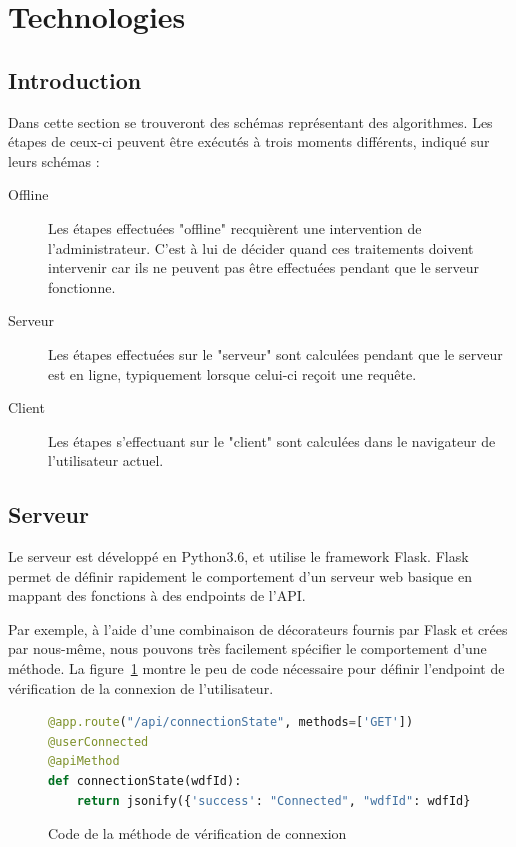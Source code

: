 
\section{Technologies}

	\subsection{Introduction}

		Dans cette section se trouveront des schémas représentant des algorithmes. Les étapes de ceux-ci peuvent être exécutés à trois moments différents, indiqué sur leurs schémas :
		\begin{description}
			\item[Offline] Les étapes effectuées "offline" recquièrent une intervention de l'administrateur. C'est à lui de décider quand ces traitements doivent intervenir car ils ne peuvent pas être effectuées pendant que le serveur fonctionne.
			\item[Serveur] Les étapes effectuées sur le "serveur" sont calculées pendant que le serveur est en ligne, typiquement lorsque celui-ci reçoit une requête.
			\item[Client] Les étapes s'effectuant sur le "client" sont calculées dans le navigateur de l'utilisateur actuel.
		\end{description}

	\subsection{Serveur}

		Le serveur est développé en Python3.6, et utilise le framework Flask. Flask permet de définir rapidement le comportement d'un serveur web basique en mappant des fonctions à des endpoints de l'API.

		Par exemple, à l'aide d'une combinaison de décorateurs fournis par Flask et crées par nous-même, nous pouvons très facilement spécifier le comportement d'une méthode. La figure~\ref{i-code-server} montre le peu de code nécessaire pour définir l'endpoint de vérification de la connexion de l'utilisateur.

		\begin{figure}[!h]
			\centering
			\begin{lstlisting}[language=python]
@app.route("/api/connectionState", methods=['GET'])
@userConnected
@apiMethod
def connectionState(wdfId):
    return jsonify({'success': "Connected", "wdfId": wdfId})\end{lstlisting}
			\caption{Code de la méthode de vérification de connexion}
			\label{i-code-server}
		\end{figure}

